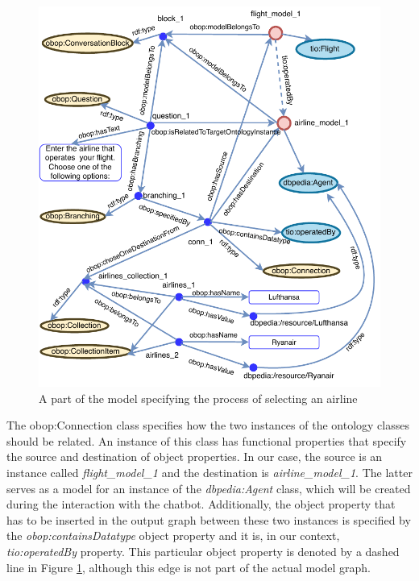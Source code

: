 \documentclass[runningheads]{llncs}
\begin{document}
\begin{figure}[H]
  \centering
  \includegraphics[width=\linewidth]{img/branching_schema}
  \caption{A part of the model specifying the process of selecting an airline}
  \label{fig:branching_schema}
\end{figure}
The obop:Connection class specifies how the two instances of the ontology classes should be related. An instance of this class has functional properties that specify the source and destination of object properties. In our case, the source is an instance called \textit{flight\_model\_1} and the destination is \textit{airline\_model\_1}. The latter serves as a model for an instance of the  \textit{dbpedia:Agent} class, which will be created during the interaction with the chatbot. Additionally, the object property that has to be inserted in the output graph between these two instances is specified by the \textit{obop:containsDatatype} object property and it is, in our context, \textit{tio:operatedBy} property. This particular object property is denoted by a dashed line in Figure \ref{fig:branching_schema}, although this edge is not part of the actual model graph.    
\end{document}
